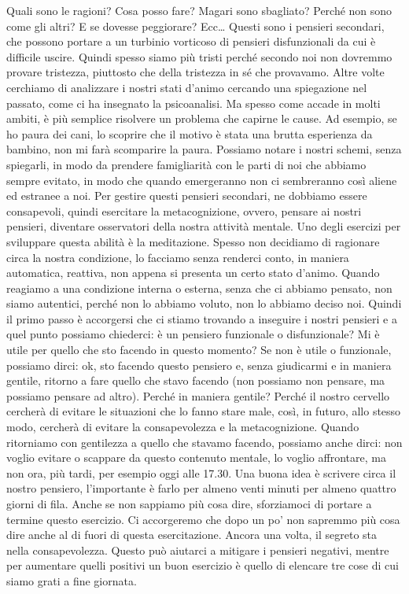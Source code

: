 \documentclass[12pt]{book} %
\begin{document}
Quali sono le ragioni? Cosa posso fare? Magari sono sbagliato? Perché non sono come gli altri? E se dovesse peggiorare?
Ecc… Questi sono i pensieri secondari, che possono portare a un turbinio vorticoso di pensieri disfunzionali da cui è
difficile uscire. Quindi spesso siamo più tristi perché secondo noi non dovremmo provare tristezza, piuttosto che della
tristezza in sé che provavamo. Altre volte cerchiamo di analizzare i nostri stati d'animo cercando
una spiegazione nel passato, come ci ha insegnato la psicoanalisi. Ma spesso come accade in molti ambiti, è più
semplice risolvere un problema che capirne le cause. Ad esempio, se ho paura dei cani, lo scoprire che il motivo è
stata una brutta esperienza da bambino, non mi farà scomparire la paura. Possiamo notare i nostri schemi, senza
spiegarli, in modo da prendere famigliarità con le parti di noi che abbiamo sempre evitato, in modo che quando
emergeranno non ci sembreranno così aliene ed estranee a noi. Per gestire questi pensieri secondari, ne dobbiamo essere
consapevoli, quindi esercitare la metacognizione, ovvero, pensare ai nostri pensieri, diventare osservatori della
nostra attività mentale. Uno degli esercizi per sviluppare questa abilità è la meditazione. Spesso non decidiamo di
ragionare circa la nostra condizione, lo facciamo senza renderci conto, in maniera automatica, reattiva, non appena si
presenta un certo stato d'animo. Quando reagiamo a una condizione interna o esterna, senza che ci
abbiamo pensato, non siamo autentici, perché non lo abbiamo voluto, non lo abbiamo deciso noi. Quindi il primo passo è
accorgersi che ci stiamo trovando a inseguire i nostri pensieri e a quel punto possiamo chiederci: è un pensiero
funzionale o disfunzionale? Mi è utile per quello che sto facendo in questo momento? Se non è utile o funzionale,
possiamo dirci: ok, sto facendo questo pensiero e, senza giudicarmi e in maniera gentile, ritorno a fare quello che
stavo facendo (non possiamo non pensare, ma possiamo pensare ad altro). 
Perché in maniera gentile? Perché il nostro cervello cercherà di evitare le situazioni che lo fanno
stare male, così, in futuro, allo stesso modo, cercherà di evitare la consapevolezza e la metacognizione. Quando
ritorniamo con gentilezza a quello che stavamo facendo, possiamo anche dirci: non voglio evitare o scappare da questo
contenuto mentale, lo voglio affrontare, ma non ora, più tardi, per esempio oggi alle 17.30. Una buona idea è scrivere
circa il nostro pensiero, l'importante è farlo per almeno venti minuti per almeno quattro giorni
di fila. Anche se non sappiamo più cosa dire, sforziamoci di portare a termine questo esercizio. Ci accorgeremo che
dopo un po' non sapremmo più cosa dire anche al di fuori di questa esercitazione. Ancora una volta, il segreto sta
nella consapevolezza. Questo può aiutarci a mitigare i pensieri negativi, mentre per aumentare quelli positivi un buon esercizio è quello di elencare tre cose di cui siamo grati a fine giornata.
\end{document}
